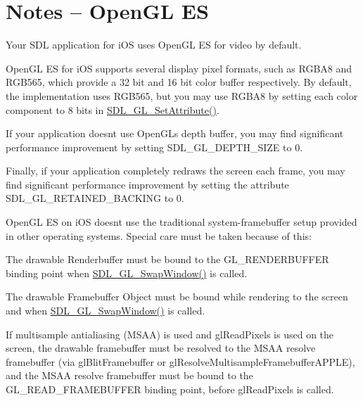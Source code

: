 \section*{Notes -- Open\+GL ES }

Your S\+DL application for i\+OS uses Open\+GL ES for video by default.

Open\+GL ES for i\+OS supports several display pixel formats, such as R\+G\+B\+A8 and R\+G\+B565, which provide a 32 bit and 16 bit color buffer respectively. By default, the implementation uses R\+G\+B565, but you may use R\+G\+B\+A8 by setting each color component to 8 bits in \mbox{\hyperlink{_s_d_l__video_8h_aed4d4347f2d5def1532bc22893e0e0d9}{S\+D\+L\+\_\+\+G\+L\+\_\+\+Set\+Attribute()}}.

If your application doesn\textquotesingle{}t use Open\+GL\textquotesingle{}s depth buffer, you may find significant performance improvement by setting S\+D\+L\+\_\+\+G\+L\+\_\+\+D\+E\+P\+T\+H\+\_\+\+S\+I\+ZE to 0.

Finally, if your application completely redraws the screen each frame, you may find significant performance improvement by setting the attribute S\+D\+L\+\_\+\+G\+L\+\_\+\+R\+E\+T\+A\+I\+N\+E\+D\+\_\+\+B\+A\+C\+K\+I\+NG to 0.

Open\+GL ES on i\+OS doesn\textquotesingle{}t use the traditional system-\/framebuffer setup provided in other operating systems. Special care must be taken because of this\+:


\begin{DoxyItemize}
\item The drawable Renderbuffer must be bound to the G\+L\+\_\+\+R\+E\+N\+D\+E\+R\+B\+U\+F\+F\+ER binding point when \mbox{\hyperlink{_s_d_l__video_8h_a11d1245662f49f6af257627119f22835}{S\+D\+L\+\_\+\+G\+L\+\_\+\+Swap\+Window()}} is called.
\item The drawable Framebuffer Object must be bound while rendering to the screen and when \mbox{\hyperlink{_s_d_l__video_8h_a11d1245662f49f6af257627119f22835}{S\+D\+L\+\_\+\+G\+L\+\_\+\+Swap\+Window()}} is called.
\item If multisample antialiasing (M\+S\+AA) is used and gl\+Read\+Pixels is used on the screen, the drawable framebuffer must be resolved to the M\+S\+AA resolve framebuffer (via gl\+Blit\+Framebuffer or gl\+Resolve\+Multisample\+Framebuffer\+A\+P\+P\+LE), and the M\+S\+AA resolve framebuffer must be bound to the G\+L\+\_\+\+R\+E\+A\+D\+\_\+\+F\+R\+A\+M\+E\+B\+U\+F\+F\+ER binding point, before gl\+Read\+Pixels is called.
\end{DoxyItemize}

